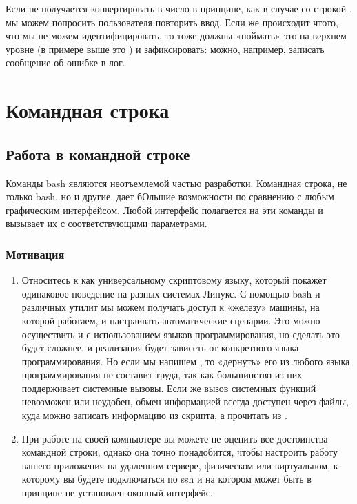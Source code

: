 \documentclass[letterpaper,10pt,russian]{sphinxmanual}
\begin{document}
\sphinxAtStartPar
Если не получается конвертировать в число в принципе, как в случае со строкой , мы можем попросить пользователя повторить ввод. Если же происходит что\sphinxhyphen{}то, что мы не можем идентифицировать, то тоже должны «поймать» это на верхнем уровне (в примере выше это ) и зафиксировать: можно, например, записать сообщение об ошибке в лог.


\chapter{Командная строка}
\label{\detokenize{index:id2}}
\sphinxstepscope


\section{Работа в командной строке}
\label{\detokenize{educational_materials/bash/content:id1}}\label{\detokenize{educational_materials/bash/content::doc}}
\sphinxAtStartPar
Команды bash являются неотъемлемой частью разработки. Командная строка, не только bash, но и другие, дает бОльшие возможности по сравнению с любым графическим интерфейсом. Любой интерфейс полагается на эти команды и вызывает их с соответствующими параметрами.


\subsection{Мотивация}
\label{\detokenize{educational_materials/bash/content:id2}}\begin{enumerate}
%
\item {} 
\sphinxAtStartPar
Относитесь к  как универсальному скриптовому языку, который покажет одинаковое поведение на разных системах Линукс. С помощью bash и различных утилит мы можем получать доступ к «железу» машины, на которой работаем, и настраивать автоматические сценарии. Это можно осуществить и с использованием языков программирования, но сделать это будет сложнее, и реализация будет зависеть от конкретного языка программирования. Но если мы напишем , то «дернуть» его из любого языка программирования не составит труда, так как большинство из них поддерживает системные вызовы. Если же вызов системных функций невозможен или неудобен, обмен информацией всегда доступен через файлы, куда можно записать информацию из \sphinxhyphen{}скрипта, а прочитать из .

\item {} 
\sphinxAtStartPar
При работе на своей компьютере вы можете не оценить все достоинства командной строки, однако она точно понадобится, чтобы настроить работу вашего приложения на удаленном сервере, физическом или виртуальном, к которому вы будете подключаться по ssh и на котором может быть в принципе не установлен оконный интерфейс.

\end{enumerate}
\end{document}

